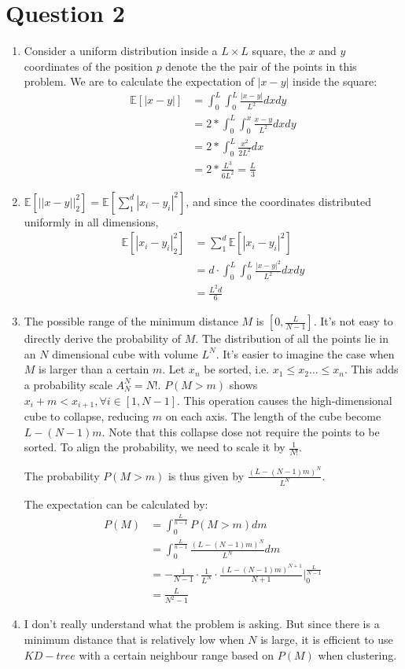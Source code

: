 \documentclass{article}
\begin{document}
	
	\section*{Question 2}
	\begin{enumerate}[1.]
		\item Consider a uniform distribution inside a $L\times L$ square, the $x$ and $y$ coordinates of the position $p$ denote the the pair of the points in this problem. We are to calculate the expectation of $|x-y|$ inside the square:
		\begin{align*}
			\mathbb E [|x-y|] & = \int_0^L\int_0^L \frac{|x-y|}{L^2} dx dy \\
			& = 2 * \int_0^L\int_0^x \frac{x-y}{L^2} dx dy \\
			& = 2 * \int_0^L \frac{x^2}{2L^2}dx \\
			& = 2*\frac{L^3}{6L^2} = \frac{L}{3}
		\end{align*}
		\item $\mathbb E [||x-y||_2^2] = \mathbb E [\sum_1^d |x_i - y_i|^2] $, and since the coordinates distributed uniformly in all dimensions, 
		\begin{align*}
			\mathbb E [ |x_i - y_i|_2^2] & = \sum_1^d \mathbb E [ |x_i - y_i|^2] \\
			& = d \cdot \int_0^L\int_0^L \frac{|x-y|^2}{L^2} dx dy \\
			& = \frac{L^2d}{6}
		\end{align*}
		\item The possible range of the minimum distance $M$ is $[0, \frac{L}{N-1}]$. It's not easy to directly derive the probability of $M$. The distribution of all the points lie in an $N$ dimensional cube with volume $L^N$. It's easier to imagine the case when $M$ is larger than a certain $m$. Let ${x_n}$ be sorted, i.e. $x_1\leq x_2\dots \leq x_n$. This adds a probability scale $A_N^N=N!$. $P(M>m)$ shows $x_i + m < x_{i+1}, \forall i \in [1, N-1]$. This operation causes the high-dimensional cube to collapse, reducing $m$ on each axis. The length of the cube become $L - (N-1)m$. Note that this collapse dose not require the points to be sorted. To align the probability, we need to scale it by $\frac{1}{N!}$. 
		
		The probability $P(M>m)$ is thus given by $\frac{(L - (N-1)m)^N}{L^N}$.
		
		The expectation can be calculated by:
		\begin{align*}
			P(M) & = \int_0^{\frac{L}{n-1}}P(M>m)dm \\
			& = \int_0^{\frac{L}{n-1}} \frac{(L - (N-1)m)^N}{L^N} dm \\
			& =  - \frac{1}{N-1}\cdot\frac{1}{L^N} \cdot \frac{(L-(N-1)m)^{N+1}}{N+1} \bigg|_{0}^{\frac{L}{N-1}} \\
			& = \frac{L}{N^2-1}
		\end{align*}
		\item I don't really understand what the problem is asking. But since there is a minimum distance that is relatively low when $N$ is large, it is efficient to use $KD-tree$ with a certain neighbour range based on $P(M)$ when clustering. 
	\end{enumerate}
\end{document}
